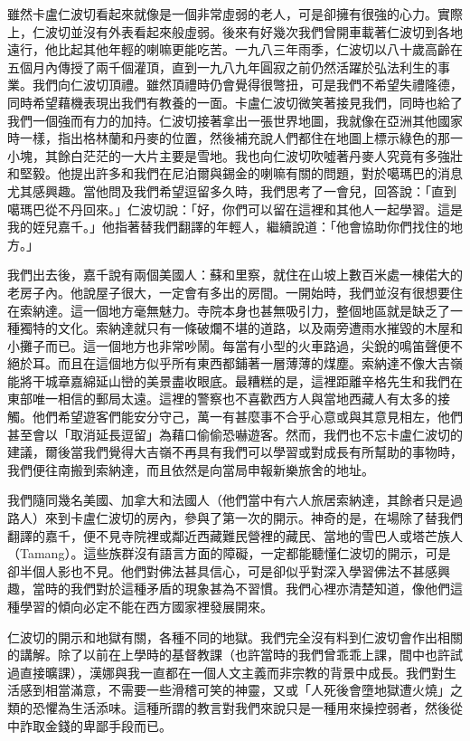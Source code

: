 
雖然卡盧仁波切看起來就像是一個非常虛弱的老人，可是卻擁有很強的心力。實際上，仁波切並沒有外表看起來般虛弱。後來有好幾次我們曾開車載著仁波切到各地遠行，他比起其他年輕的喇嘛更能吃苦。一九八三年雨季，仁波切以八十歲高齡在五個月內傳授了兩千個灌頂，直到一九八九年圓寂之前仍然活躍於弘法利生的事業。我們向仁波切頂禮。雖然頂禮時仍會覺得很彆扭，可是我們不希望失禮隆德，同時希望藉機表現出我們有教養的一面。卡盧仁波切微笑著接見我們，同時也給了我們一個強而有力的加持。仁波切接著拿出一張世界地圖，我就像在亞洲其他國家時一樣，指出格林蘭和丹麥的位置，然後補充說人們都住在地圖上標示綠色的那一小塊，其餘白茫茫的一大片主要是雪地。我也向仁波切吹噓著丹麥人究竟有多強壯和堅毅。他提出許多和我們在尼泊爾與錫金的喇嘛有關的問題，對於噶瑪巴的消息尤其感興趣。當他問及我們希望逗留多久時，我們思考了一會兒，回答說：「直到噶瑪巴從不丹回來。」仁波切說：「好，你們可以留在這裡和其他人一起學習。這是我的姪兒嘉千。」他指著替我們翻譯的年輕人，繼續說道：「他會協助你們找住的地方。」

我們出去後，嘉千說有兩個美國人：蘇和里察，就住在山坡上數百米處一棟偌大的老房子內。他說屋子很大，一定會有多出的房間。一開始時，我們並沒有很想要住在索納達。這一個地方毫無魅力。寺院本身也甚無吸引力，整個地區就是缺乏了一種獨特的文化。索納達就只有一條破爛不堪的道路，以及兩旁遭雨水摧毀的木屋和小攤子而已。這一個地方也非常吵鬧。每當有小型的火車路過，尖銳的鳴笛聲便不絕於耳。而且在這個地方似乎所有東西都鋪著一層薄薄的煤塵。索納達不像大吉嶺能將干城章嘉綿延山巒的美景盡收眼底。最糟糕的是，這裡距離辛格先生和我們在東部唯一相信的郵局太遠。這裡的警察也不喜歡西方人與當地西藏人有太多的接觸。他們希望遊客們能安分守己，萬一有甚麼事不合乎心意或與其意見相左，他們甚至會以「取消延長逗留」為藉口偷偷恐嚇遊客。然而，我們也不忘卡盧仁波切的建議，爾後當我們覺得大吉嶺不再具有我們可以學習或對成長有所幫助的事物時，我們便往南搬到索納達，而且依然是向當局申報新樂旅舍的地址。

我們隨同幾名美國、加拿大和法國人（他們當中有六人旅居索納達，其餘者只是過路人）來到卡盧仁波切的房內，參與了第一次的開示。神奇的是，在場除了替我們翻譯的嘉千，便不見寺院裡或鄰近西藏難民營裡的藏民、當地的雪巴人或塔芒族人（Tamang）。這些族群沒有語言方面的障礙，一定都能聽懂仁波切的開示，可是卻半個人影也不見。他們對佛法甚具信心，可是卻似乎對深入學習佛法不甚感興趣，當時的我們對於這種矛盾的現象甚為不習慣。我們心裡亦清楚知道，像他們這種學習的傾向必定不能在西方國家裡發展開來。

仁波切的開示和地獄有關，各種不同的地獄。我們完全沒有料到仁波切會作出相關的講解。除了以前在上學時的基督教課（也許當時的我們曾乖乖上課，間中也許試過直接曠課），漢娜與我一直都在一個人文主義而非宗教的背景中成長。我們對生活感到相當滿意，不需要一些滑稽可笑的神靈，又或「人死後會墮地獄遭火燒」之類的恐懼為生活添味。這種所謂的教言對我們來說只是一種用來操控弱者，然後從中詐取金錢的卑鄙手段而已。

